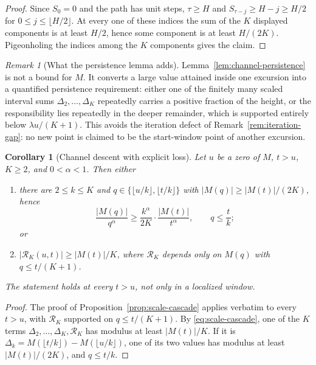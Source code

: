 \documentclass[11pt]{amsart}
\numberwithin{equation}{section}
\theoremstyle{plain}
\newtheorem{corollary}[theorem]{Corollary}
\theoremstyle{definition}
\theoremstyle{remark}
\newtheorem{remark}[theorem]{Remark}
\begin{document}
\begin{proof}
Since $S_0=0$ and the path has unit steps, $\tau\ge H$ and
$S_{\tau-j}\ge H-j\ge H/2$ for
$0\le j\le\lfloor H/2\rfloor$.  At every one of these indices the sum of
the $K$ displayed components is at least $H/2$, hence some component is at
least $H/(2K)$.  Pigeonholing the indices among the $K$ components gives the
claim.
\end{proof}

\begin{remark}[What the persistence lemma adds]
\label{rem:persistence-content}
Lemma~\ref{lem:channel-persistence} is not a bound for $M$.  It converts a
large value attained inside one excursion into a quantified persistence
requirement: either one of the finitely many scaled interval sums
$\Delta_2,\ldots,\Delta_K$ repeatedly carries a positive fraction of the
height, or the responsibility lies repeatedly in the deeper remainder,
which is supported entirely below $\lambda u/(K+1)$.  This avoids the
iteration defect of Remark~\ref{rem:iteration-gap}: no new point is claimed
to be the start-window point of another excursion.
\end{remark}
\begin{corollary}[Channel descent with explicit loss]
\label{cor:channel-descent}
Let $u$ be a zero of $M$, $t>u$, $K\ge2$, and $0<\alpha<1$. Then either
\begin{enumerate}[label=\textup{(\roman*)}]
\item there are $2\le k\le K$ and $q\in\{\lfloor u/k\rfloor,\lfloor t/k\rfloor\}$
with $|M(q)|\ge|M(t)|/(2K)$, hence
\[
\frac{|M(q)|}{q^\alpha}\ge\frac{k^\alpha}{2K}\cdot\frac{|M(t)|}{t^\alpha},
\qquad q\le\frac tk;
\]
or
\item $|\mathcal R_K(u,t)|\ge|M(t)|/K$, where $\mathcal R_K$ depends only on
$M(q)$ with $q\le t/(K+1)$.
\end{enumerate}
The statement holds at every $t>u$, not only in a localized window.
\end{corollary}

\begin{proof}
The proof of Proposition~\ref{prop:scale-cascade} applies verbatim to every
$t>u$, with $\mathcal R_K$ supported on $q\le t/(K+1)$. By \eqref{eq:scale-cascade}, one of the $K$ terms
$\Delta_2,\dots,\Delta_K,\mathcal R_K$ has modulus at least $|M(t)|/K$. If it is
$\Delta_k=M(\lfloor t/k\rfloor)-M(\lfloor u/k\rfloor)$, one of its two values
has modulus at least $|M(t)|/(2K)$, and $q\le t/k$.
\end{proof}
\end{document}
